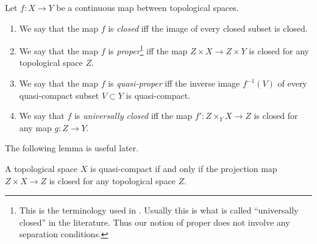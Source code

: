 \begin{definition}
\label{definition-proper-map}
Let $f : X\to Y$ be a continuous map between topological spaces.
\begin{enumerate}
\item We say that the map $f$ is {\it closed}
iff the image of every closed subset is closed.
\item We say that the map $f$ is {\it proper}\footnote{This is the
terminology used in \cite{Bourbaki}. Usually this is what
is called ``universally closed'' in the literature. Thus our notion
of proper does not involve any separation conditions.} iff
the map $Z \times X\to Z \times Y$ is closed for any topological space
$Z$.
\item We say that the map $f$ is {\it quasi-proper} iff
the inverse image $f^{-1}(V)$ of every quasi-compact subset $V \subset Y$
is quasi-compact.
\item We say that $f$ is {\it universally closed} iff
the map $f': Z \times_Y X \to Z$ is closed for any map $g: Z \to Y$.
\end{enumerate}
\end{definition}

\noindent
The following lemma is useful later.

\begin{lemma}
\label{lemma-characterize-quasi-compact}
A topological space $X$ is quasi-compact if and only if the
projection map $Z \times X \to Z$ is closed for
any topological space $Z$.
\end{lemma}

